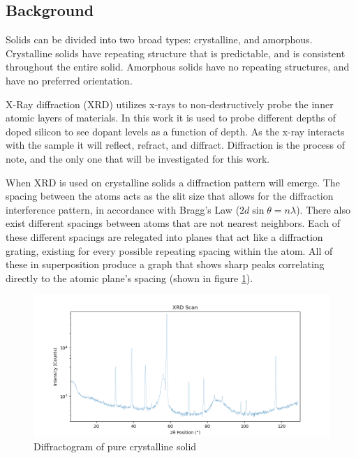 \documentclass{article}
\begin{document}
\begin{multicols}{2}
    
\section{Background}

    Solids can be divided into two broad types: crystalline, and amorphous. 
    Crystalline solids have repeating structure that is predictable, and is consistent throughout the entire solid. 
    Amorphous solids have no repeating structures, and have no preferred orientation.
    
    X-Ray diffraction (XRD) utilizes x-rays to non-destructively probe the inner atomic layers of materials. 
    In this work it is used to probe different depths of doped silicon to see dopant levels as a function of depth. 
    As the x-ray interacts with the sample it will reflect, refract, and diffract. 
    Diffraction is the process of note, and the only one that will be investigated for this work. 

    When XRD is used on crystalline solids a diffraction pattern will emerge. 
    The spacing between the atoms acts as the slit size that allows for the diffraction interference pattern, in accordance with Bragg's Law ($2d\sin\theta=n\lambda$). 
    There also exist different spacings between atoms that are not nearest neighbors. 
    Each of these different spacings are relegated into planes that act like a diffraction grating, existing for every possible repeating spacing within the atom. 
    All of these in superposition produce a graph that shows sharp peaks correlating directly to the atomic plane's spacing (shown in figure \ref{fig:pure crystalline XRD scan}).
    
\begin{figure}[H]
    \centering
    \includegraphics[width=\linewidth]{crystalline XRD scan.png}
    \caption{Diffractogram of pure crystalline solid}
    \label{fig:pure crystalline XRD scan}
\end{figure}


\end{multicols}
\end{document}

